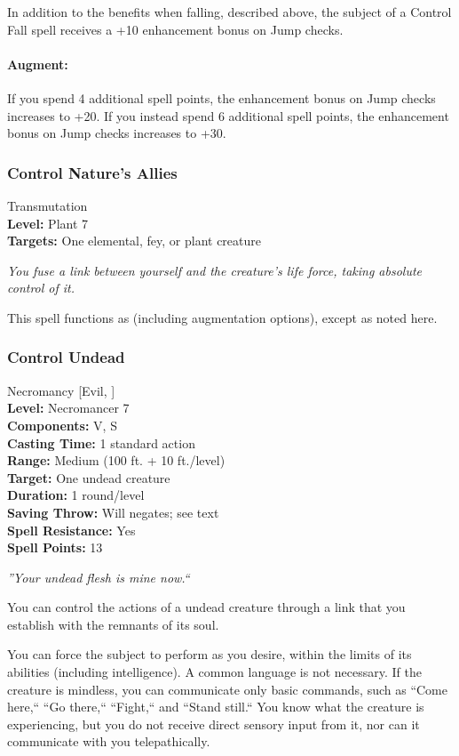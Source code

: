 In addition to the benefits when falling, described above, the subject of a Control Fall spell receives a +10 enhancement bonus on Jump checks.

\paragraph{Augment:} If you spend 4 additional spell points, the enhancement bonus on Jump checks increases to +20.
If you instead spend 6 additional spell points, the enhancement bonus on Jump checks increases to +30.
\subsubsection{Control Nature's Allies}
\label{Spell:ControlNaturesAllies}
Transmutation
\\ \textbf{Level:} Plant 7
\\ \textbf{Targets:} One elemental, fey, or plant creature

\emph{You fuse a link between yourself and the creature's life force, taking absolute control of it.}

This spell functions as  (including augmentation options), except as noted here.
\subsubsection{Control Undead}
\label{Spell:ControlUndead}
Necromancy [Evil, ]
\\ \textbf{Level:} Necromancer 7
\\ \textbf{Components:} V, S
\\ \textbf{Casting Time:} 1 standard action
\\ \textbf{Range:} Medium (100 ft. + 10 ft./level)
\\ \textbf{Target:} One undead creature
\\ \textbf{Duration:} 1 round/level
\\ \textbf{Saving Throw:} Will negates; see text
\\ \textbf{Spell Resistance:} Yes
\\ \textbf{Spell Points:} 13

\emph{''Your undead flesh is mine now.``}

You can control the actions of a undead creature through a link that you establish with the remnants of its soul.

You can force the subject to perform as you desire, within the limits of its abilities (including intelligence).
A common language is not necessary.
If the creature is mindless, you can communicate only basic commands, such as ``Come here,`` ``Go there,`` ``Fight,`` and ``Stand still.`` 
You know what the creature is experiencing, but you do not receive direct sensory input from it, nor can it communicate with you telepathically.

